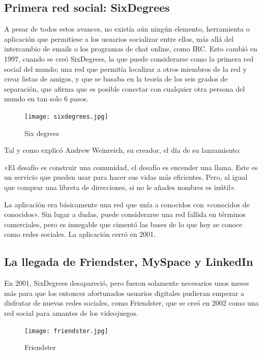 \subsection{Primera red social: SixDegrees}

A pesar de todos estos avances, no existía aún ningún elemento, herramienta o aplicación que permitiese a los usuarios socializar entre ellos, más allá del intercambio de emails o los programas de chat online, como IRC. Esto cambió en 1997, cuando se creó SixDegrees, la que puede considerarse como la primera red social del mundo; una red que permitía localizar a otros miembros de la red y crear listas de amigos, y que se basaba en la teoría de los seis grados de separación, que afirma que es posible conectar con cualquier otra persona del mundo en tan solo 6 pasos.

\begin{figure}[ht!]
    \texttt{[image: sixdegrees.jpg]}
    \caption{Six degrees}
    \label{sixdegrees}
\end{figure}

Tal y como explicó Andrew Weinreich, su creador, el día de su lanzamiento:

«El desafío es construir una comunidad, el desafío es encender una llama. Este es un servicio que pueden usar para hacer sus vidas más eficientes. Pero, al igual que comprar una libreta de direcciones, si no le añades nombres es inútil».

La aplicación era básicamente una red que unía a conocidos con «conocidos de conocidos». Sin lugar a dudas, puede considerarse una red fallida en términos comerciales, pero es innegable que cimentó las bases de lo que hoy se conoce como redes sociales. La aplicación cerró en 2001.

\subsection{La llegada de Friendster, MySpace y LinkedIn}

En 2001, SixDegrees desapareció, pero fueron solamente necesarios unos meses más para que los entonces afortunados usuarios digitales pudieran empezar a disfrutar de nuevas redes sociales, como Friendster, que se creó en 2002 como una red social para amantes de los videojuegos.

\begin{figure}[ht!]
    \texttt{[image: friendster.jpg]}
    \caption{Friendster}
    \label{friendster}
\end{figure}

